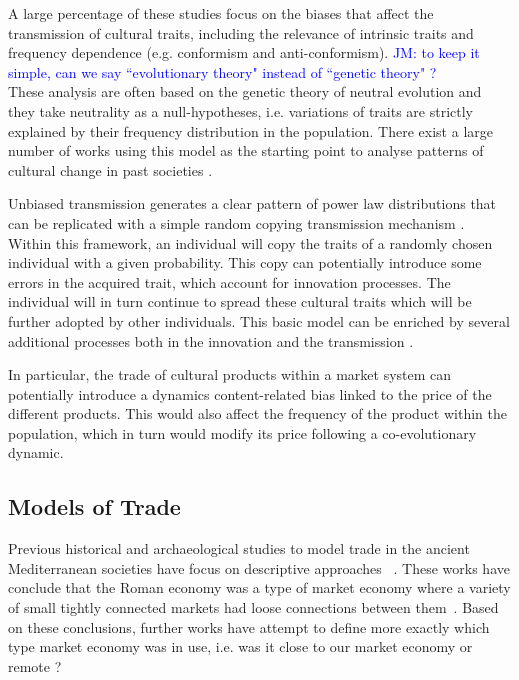 \documentclass{wscpaperproc}
\newcommand{\memo}[2]{\textcolor{#1}{#2}}
\newcommand{\jm}[1]{\memo{blue}{JM: #1\\}}
\begin{document}
A large percentage of these studies focus on the biases that affect the transmission of cultural traits, including the relevance of intrinsic traits and frequency dependence (e.g. conformism and anti-conformism). 
\jm{to keep it simple, can we say ``evolutionary theory" instead of ``genetic theory" ?}
These analysis are often based on the genetic theory of neutral evolution \cite{neiman_stylistic_1995} and they take neutrality as a null-hypotheses, i.e. variations of traits are strictly explained by their frequency distribution in the population. There exist a large number of works using this model as the starting point to analyse patterns of cultural change in past societies \cite{lipo_neutralitystyle_2001,shennan_ceramic_2001,steele_ceramic_2010,kandler_nonequilibrium_2013,porcic_exploring_2014,crema_approximate_2014}.

Unbiased transmission generates a clear pattern of power law distributions that can be replicated with a simple random copying transmission mechanism \cite{bentley_random_2004}. Within this framework, an individual will copy the traits of a randomly chosen individual with a given probability. This copy can potentially introduce some errors in the acquired trait, which account for innovation processes. The individual will in turn continue to spread these cultural traits which will be further adopted by other individuals. This basic model can be enriched by several additional processes both in the innovation \cite{schillinger_copying_2014,sole_evolutionary_2013,ziman_technological_2003} and the transmission \cite{heyes_social_1994,henrich_evolution_2003}.

In particular, the trade of cultural products within a market system can potentially introduce a dynamics content-related bias linked to the price of the different products. This would also affect the frequency of the product within the population, which in turn would modify its price following a co-evolutionary dynamic.


\subsection{Models of Trade}


Previous historical and archaeological studies to model trade in the ancient Mediterranean societies have focus on descriptive approaches ~\cite{hopkins_taxes_1980,temin_market_2001,terpstra_trade_2011,temin_economy_2006,wilson_approaches_2009,scheidel_model_2007,kessler_organization_2007}. 
These works have conclude that the Roman economy was a type of market economy where a variety of small tightly connected markets had loose connections between them~\cite{temin_market_2001,temin_economy_2006,wilson_approaches_2009}. 
Based on these conclusions, further works have attempt to define more exactly which type market economy was in use, i.e. was it close to our market economy or remote ? 
\end{document}
